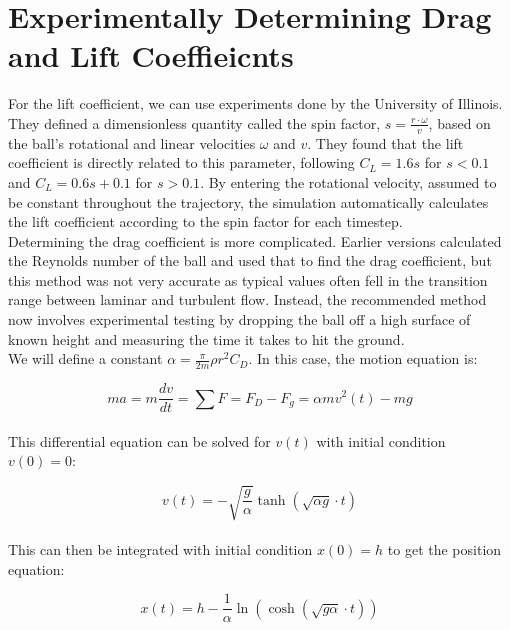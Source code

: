\documentclass[a4paper]{article}
\begin{document}
	
	\section*{Experimentally Determining Drag and Lift Coeffieicnts}
	
	For the lift coefficient, we can use experiments done by the University of Illinois. They defined a dimensionless quantity called the spin factor, $ s = \frac{r \cdot \omega}{v} $, based on the ball's rotational and linear velocities $ \omega $ and $ v $. They found that the lift coefficient is directly related to this parameter, following $ C_L = 1.6 s $ for $ s < 0.1 $ and $ C_L = 0.6 s + 0.1 $ for $ s > 0.1 $. By entering the rotational velocity, assumed to be constant throughout the trajectory, the simulation automatically calculates the lift coefficient according to the spin factor for each timestep.\\
	
	Determining the drag coefficient is more complicated. Earlier versions calculated the Reynolds number of the ball and used that to find the drag coefficient, but this method was not very accurate as typical values often fell in the transition range between laminar and turbulent flow. Instead, the recommended method now involves experimental testing by dropping the ball off a high surface of known height and measuring the time it takes to hit the ground.\\
	
	We will define a constant $ \alpha = \frac{\pi}{2 m} \rho r^2 C_D  $. In this case, the motion equation is:
	
	\begin{equation}
		m a = m \frac{dv}{dt} = \sum F = F_D - F_g = \alpha m v^2 (t) - m g
	\end{equation}\\
	
	This differential equation can be solved for $ v(t) $ with initial condition $ v(0) = 0 $:
	
	\begin{equation}
		v(t) = -\sqrt{\frac{g}{\alpha}} \tanh \left( \sqrt{\alpha g} \cdot t \right)
	\end{equation}\\
	
	This can then be integrated with initial condition $ x(0) = h $ to get the position equation:
	
	\begin{equation}
		x(t) = h - \frac{1}{\alpha} \ln \left( \cosh \left( \sqrt{g \alpha} \cdot t \right) \right)
	\end{equation}\\
	
\end{document}
